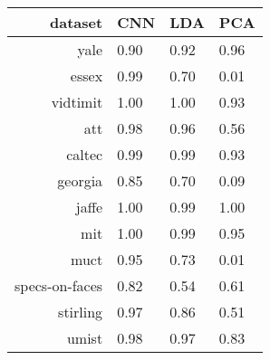 \begin{tabular}{|r|l|l|l|}
  \hline
  \rowcolor{Gray}
  dataset & CNN & LDA & PCA \\
  \hline
  yale & 0.90 & 0.92 & 0.96 \\
  \hline
  essex & 0.99 & 0.70 & 0.01 \\
  \hline
  vidtimit & 1.00 & 1.00 & 0.93 \\
  \hline
  att & 0.98 & 0.96 & 0.56 \\
  \hline
  caltec & 0.99 & 0.99 & 0.93 \\
  \hline
  georgia & 0.85 & 0.70 & 0.09 \\
  \hline
  jaffe & 1.00 & 0.99 & 1.00 \\
  \hline
  mit & 1.00 & 0.99 & 0.95 \\
  \hline
  muct & 0.95 & 0.73 & 0.01 \\
  \hline
  specs-on-faces & 0.82 & 0.54 & 0.61 \\
  \hline
  stirling & 0.97 & 0.86 & 0.51 \\
  \hline
  umist & 0.98 & 0.97 & 0.83 \\
  \hline
\end{tabular}

